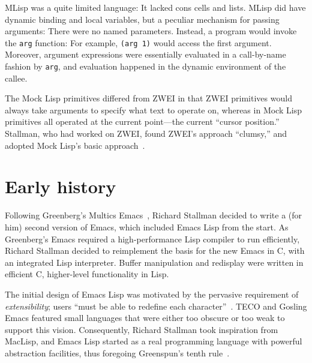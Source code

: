 \documentclass[format=acmsmall, review]{acmart}
\newcommand \Elisp {Emacs Lisp}
\begin{document}
MLisp was a quite limited language: It lacked cons cells and lists.
MLisp did have dynamic binding and local variables, but a peculiar
mechanism for passing arguments:  There were no named
parameters.  Instead, a program would invoke the \texttt{arg}
function: For example, \texttt{(arg 1)} would access the first
argument.  Moreover, argument expressions were essentially evaluated
in a call-by-name fashion by \texttt{arg}, and evaluation happened in
the dynamic environment of the callee.

The Mock Lisp primitives differed from ZWEI in that ZWEI primitives
would always take arguments to specify what text to operate on,
whereas in Mock Lisp primitives all operated at the current
point---the current ``cursor position.''  Stallman, who had worked on
ZWEI, found ZWEI's approach ``clumsy,'' and adopted Mock Lisp's basic
approach~\cite{Stallman2018-personal}.


\section{Early history}         %
\label{sec:early-history}

Following Greenberg's Multics Emacs~\cite{MulticsEmacs1996},
Richard Stallman decided to write a (for
him) second version of Emacs, which included \Elisp{} from the start.
As Greenberg's Emacs required a high-performance Lisp compiler to run
efficiently, Richard Stallman decided to reimplement the basis for the new
Emacs in C, with an integrated Lisp interpreter.  Buffer manipulation
and redisplay were written in efficient C, higher-level functionality
in Lisp.

The initial design of \Elisp{} was motivated by the pervasive
requirement of \emph{extensibility}; users ``must be able to
redefine each character''~\cite{Stallman1981}.  TECO and Gosling Emacs
featured small languages that were either too obscure or too weak to
support this vision.  Consequently, Richard Stallman took inspiration from
MacLisp, and \Elisp{} started as a real programming language with
powerful abstraction facilities, thus foregoing Greenspun's tenth
rule~\cite{GreenspunsRule}.
\end{document}
